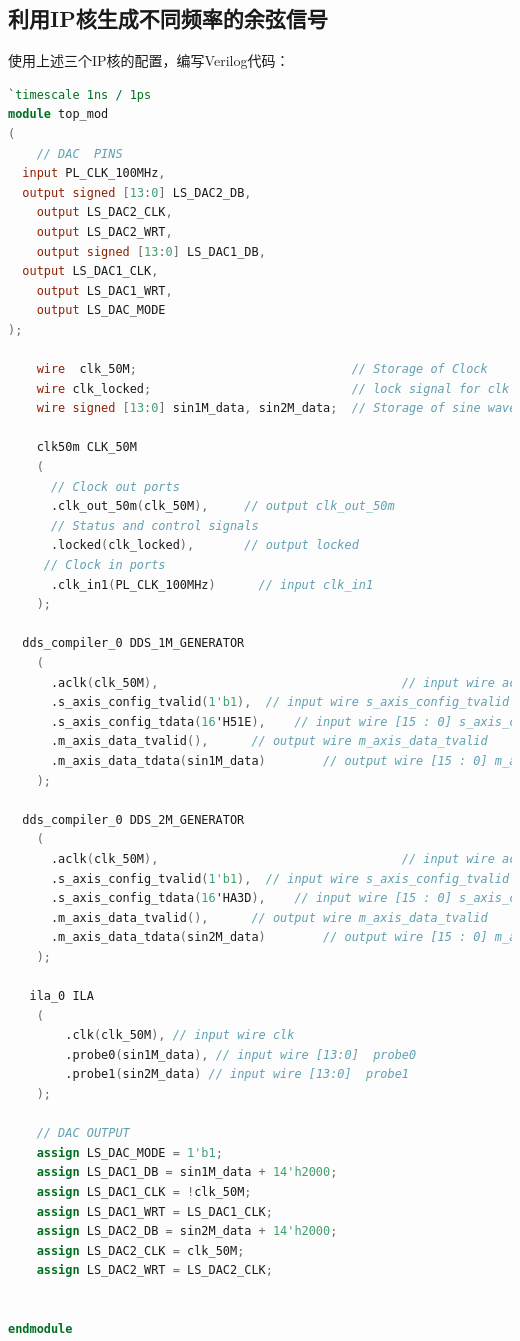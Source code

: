 \documentclass[lang=cn,newtx,10pt,scheme=chinese]{elegantbook}
\begin{document}
\subsection{利用IP核生成不同频率的余弦信号}
使用上述三个IP核的配置，编写Verilog代码：
\begin{lstlisting}[language=verilog]
`timescale 1ns / 1ps
module top_mod
(
	// DAC  PINS
  input PL_CLK_100MHz, 
  output signed [13:0] LS_DAC2_DB,   
	output LS_DAC2_CLK,              
	output LS_DAC2_WRT,         
	output signed [13:0] LS_DAC1_DB, 
  output LS_DAC1_CLK, 
	output LS_DAC1_WRT,
	output LS_DAC_MODE
);

	wire  clk_50M;                              // Storage of Clock
	wire clk_locked;                            // lock signal for clk
	wire signed [13:0] sin1M_data, sin2M_data;  // Storage of sine waves
	
	clk50m CLK_50M
    (
      // Clock out ports
      .clk_out_50m(clk_50M),     // output clk_out_50m
      // Status and control signals
      .locked(clk_locked),       // output locked
     // Clock in ports
      .clk_in1(PL_CLK_100MHz)      // input clk_in1
    );
    
  dds_compiler_0 DDS_1M_GENERATOR 
    (
      .aclk(clk_50M),                                  // input wire aclk
      .s_axis_config_tvalid(1'b1),  // input wire s_axis_config_tvalid
      .s_axis_config_tdata(16'H51E),    // input wire [15 : 0] s_axis_config_tdata
      .m_axis_data_tvalid(),      // output wire m_axis_data_tvalid
      .m_axis_data_tdata(sin1M_data)        // output wire [15 : 0] m_axis_data_tdata
    );
    
  dds_compiler_0 DDS_2M_GENERATOR 
    (  
      .aclk(clk_50M),                                  // input wire aclk
      .s_axis_config_tvalid(1'b1),  // input wire s_axis_config_tvalid
      .s_axis_config_tdata(16'HA3D),    // input wire [15 : 0] s_axis_config_tdata
      .m_axis_data_tvalid(),      // output wire m_axis_data_tvalid
      .m_axis_data_tdata(sin2M_data)        // output wire [15 : 0] m_axis_data_tdata
    );

   ila_0 ILA 
    (
	    .clk(clk_50M), // input wire clk
	    .probe0(sin1M_data), // input wire [13:0]  probe0  
	    .probe1(sin2M_data) // input wire [13:0]  probe1
    );
		
	// DAC OUTPUT
	assign LS_DAC_MODE = 1'b1;
	assign LS_DAC1_DB = sin1M_data + 14'h2000;
	assign LS_DAC1_CLK = !clk_50M;
	assign LS_DAC1_WRT = LS_DAC1_CLK;
	assign LS_DAC2_DB = sin2M_data + 14'h2000;
	assign LS_DAC2_CLK = clk_50M;
	assign LS_DAC2_WRT = LS_DAC2_CLK;

	
endmodule
\end{lstlisting}
\end{document}
